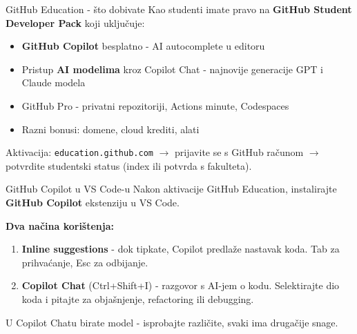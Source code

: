 
\begin{frame}{GitHub Education - što dobivate}
Kao studenti imate pravo na \textbf{GitHub Student Developer Pack} koji uključuje:

\begin{itemize}
  \item \textbf{GitHub Copilot} besplatno - AI autocomplete u editoru
  \item Pristup \textbf{AI modelima} kroz Copilot Chat - najnovije generacije GPT i Claude modela
  \item GitHub Pro - privatni repozitoriji, Actions minute, Codespaces
  \item Razni bonusi: domene, cloud krediti, alati
\end{itemize}

\vspace{0.4em}
Aktivacija: \texttt{education.github.com} $\rightarrow$ prijavite se s GitHub računom $\rightarrow$ potvrdite studentski status (index ili potvrda s fakulteta).
\end{frame}

\begin{frame}{GitHub Copilot u VS Code-u}
Nakon aktivacije GitHub Education, instalirajte \textbf{GitHub Copilot} ekstenziju u VS Code.

\vspace{0.4em}
\textbf{Dva načina korištenja:}
\begin{enumerate}
  \item \textbf{Inline suggestions} - dok tipkate, Copilot predlaže nastavak koda. Tab za prihvaćanje, Esc za odbijanje.
  \item \textbf{Copilot Chat} (Ctrl+Shift+I) - razgovor s AI-jem o kodu. Selektirajte dio koda i pitajte za objašnjenje, refactoring ili debugging.
\end{enumerate}

\vspace{0.4em}
U Copilot Chatu birate model - isprobajte različite, svaki ima drugačije snage.
\end{frame}


